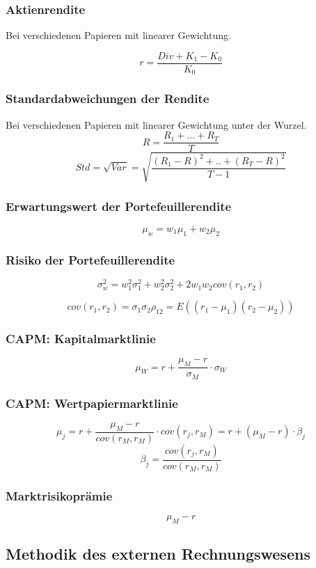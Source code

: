 \subsubsection{Aktienrendite}
Bei verschiedenen Papieren mit linearer Gewichtung.

\[r = \frac{Div + K_1 - K_0}{K_0}\]

\subsubsection{Standardabweichungen der Rendite}
Bei verschiedenen Papieren mit linearer Gewichtung unter der Wurzel.
\[R = \frac{R_1+...+R_T}{T}\]
\[Std = \sqrt{Var} = \sqrt{\frac{(R_1-R)^2+..+(R_T-R)^2}{T-1}}\]

\subsubsection{Erwartungswert der Portefeuillerendite}
\[\mu_w = w_1\mu_1 + w_2\mu_2\]

\subsubsection{Risiko der Portefeuillerendite}
\[\sigma^2_w = w^2_1\sigma^2_1+w^2_2\sigma^2_2+2w_1w_2cov(r_1,r_2)\]

\[cov(r_1,r_2) = \sigma_1\sigma_2\rho_{12} = E((r_1-\mu_1)(r_2-\mu_2))\]

\subsubsection{CAPM: Kapitalmarktlinie}
\[\mu_W = r + \frac{\mu_M-r}{\sigma_M}\cdot\sigma_W\]

\subsubsection{CAPM: Wertpapiermarktlinie}
\[\mu_j = r + \frac{\mu_M-r}{cov(r_M,r_M)}\cdot cov(r_j,r_M) = r + (\mu_M-r)\cdot \beta_j\]
\[\beta_j = \frac{cov(r_j,r_M)}{cov(r_M,r_M)}\]

\subsubsection{Marktrisikoprämie}
\[\mu_M - r\]


\subsection{Methodik des externen Rechnungswesens}


